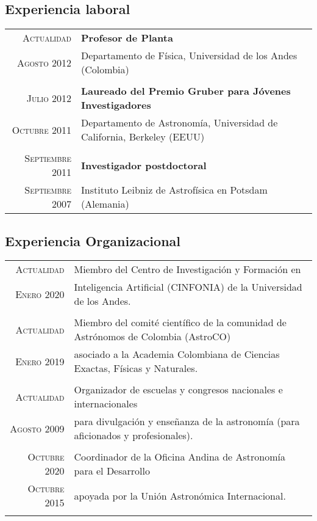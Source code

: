 \documentclass[a4paper,10pt]{article} %
\begin{document}
\color{red}
\subsection{Experiencia laboral}
\color{black}

\begin{tabular}{rl}	
 \textsc{Actualidad} &  {\bf Profesor de Planta}\\
 \textsc{Agosto 2012} & Departamento de Física, Universidad de los Andes (Colombia) \\
&\\
 \textsc{Julio 2012} &  {\bf Laureado del Premio Gruber para Jóvenes Investigadores}\\
 \textsc{Octubre 2011} & Departamento de Astronomía, Universidad de California, Berkeley (EEUU) \\
&\\
 \textsc{Septiembre 2011} &  {\bf Investigador postdoctoral}\\
 \textsc{Septiembre 2007} & Instituto Leibniz de Astrofísica en Potsdam (Alemania) \\ 
\end{tabular}



\color{red}
\subsection{Experiencia Organizacional}
\color{black}


\begin{tabular}{rl}	

\textsc{Actualidad} & Miembro del Centro de Investigaci\'on y Formaci\'on en   \\
\textsc{Enero 2020} & Inteligencia Artificial (CINFONIA) de la Universidad de los Andes.\\
& \\ 

\textsc{Actualidad} & Miembro del comité científico de la comunidad de Astrónomos de Colombia (AstroCO)  \\
\textsc{Enero 2019} & asociado a la Academia Colombiana de Ciencias Exactas, Físicas y Naturales.\\
& \\ 
\textsc{Actualidad} & Organizador de escuelas y congresos nacionales e internacionales\\%
\textsc{Agosto 2009} & para divulgación y enseñanza de la astronomía (para aficionados y profesionales).\\
& \\ %
  \textsc{Octubre 2020} &  Coordinador de la Oficina Andina de Astronomía para el Desarrollo\\
 \textsc{Octubre 2015} & apoyada por la Unión Astronómica Internacional.\\
& \\
\end{tabular}
\end{document}
